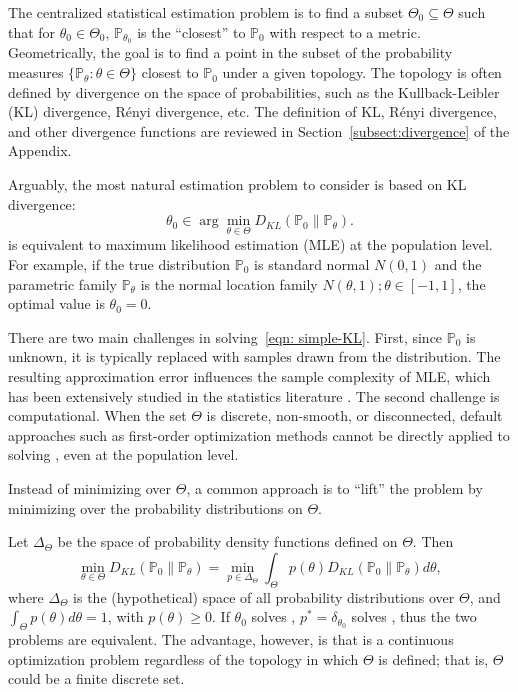 \documentclass[twoside,11pt]{article}
\numberwithin{equation}{section}
\newcommand\bP{\mathbb{P}}
\begin{document}
The centralized statistical estimation problem is to find a subset $\Theta_0 \subseteq \Theta$ such that for $\theta_0 \in \Theta_0$, $\bP_{\theta_0}$ is the ``closest'' to $\bP_0$ with respect to a metric.  Geometrically, the goal is to find a point in the subset of the probability measures $\{\bP_\theta: \theta \in \Theta\}$ closest to $\bP_0$ under a given topology. The topology is often defined by divergence on the space of probabilities, such as the Kullback-Leibler (KL) divergence, Rényi divergence, etc. The definition of KL, Rényi divergence, and other divergence functions are reviewed in Section~\ref{subsect:divergence} of the Appendix. 


Arguably, the most natural estimation problem to consider is based on KL divergence:
\begin{equation}
\label{eqn: simple-KL}
  \theta_0 \in \arg \min_{\theta \in \Theta} D_{KL}(\bP_0\parallel \bP_\theta).
\end{equation}
 is equivalent to maximum likelihood estimation (MLE) at the population level. For example, if the true distribution $\bP_0$ is standard normal $N(0,1)$ and the parametric family $\bP_\theta$ is the normal location family ${N(\theta, 1); \theta \in [-1,1]}$, the optimal value is $\theta_0 = 0$.

There are two main challenges in solving~\eqref{eqn: simple-KL}. First, since $\bP_0$ is unknown, it is typically replaced with samples drawn from the distribution. The resulting approximation error influences the sample complexity of MLE, which has been extensively studied in the statistics literature \citep{VanderVaart2000}. The second challenge is computational. When the set $\Theta$ is discrete, non-smooth, or disconnected, default approaches such as first-order optimization methods cannot be directly applied to solving , even at the population level.


Instead of minimizing over $\Theta$, a common approach is to “lift” the problem by minimizing over the probability distributions on $\Theta$.

Let $\Delta_\Theta$ be the space of probability density functions defined on $\Theta$. Then
\begin{equation}\label{eqn: simple-KL-Bayes}
    \min_{\theta \in \Theta} D_{KL}(\bP_0 \parallel \bP_\theta) = \min_{p  \in \Delta_\Theta} \int_\Theta p(\theta) D_{KL}(\bP_0\parallel \bP_\theta) d \theta,
\end{equation}
where $\Delta_\Theta$ is the (hypothetical) space of all probability distributions over $\Theta$, and \mbox{$\int_\Theta p(\theta) d\theta = 1$}, with $p(\theta) \geq 0$.  If $\theta_0$ solves , $p^* = \delta_{\theta_0}$ solves , thus the two problems are equivalent. The advantage, however, is that  is a continuous optimization problem regardless of the topology in which $\Theta$ is defined; that is, $\Theta$ could be a finite discrete set. 
\end{document}

